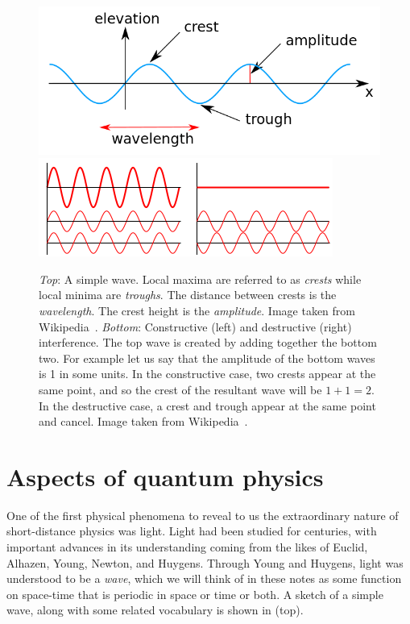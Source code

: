 \begin{figure}
  \centering
  \includegraphics[width=\linewidth]{figs/wave.png}\\
  \includegraphics[width=\linewidth]{figs/interference.png}
  \caption{{\it Top}: A simple wave. Local maxima are referred to as {\it
crests} while local minima are {\it troughs}. The
distance between crests is the {\it wavelength}. The crest
height is the {\it amplitude}. Image taken from
Wikipedia~\cite{wiki:wave}.
{\it Bottom}: Constructive (left) and destructive (right) interference. 
The top wave is created by adding together the bottom two. For example let us
say that the amplitude of the bottom waves is 1 in some units. In the
constructive case, two crests appear at the same point, and so the crest of the
resultant wave will be $1+1=2$. In the destructive case, a crest and trough
appear at the same point and cancel. Image taken from
Wikipedia~\cite{wiki:interfere}.
}
  \label{fig:wave}
\end{figure}

\section{Aspects of quantum physics}\label{sec:QM}

One of the first physical phenomena to reveal to us the extraordinary nature of
short-distance physics was light. Light had been studied for centuries, with
important advances in its understanding coming from the likes of Euclid, Alhazen,
Young, Newton, and Huygens. Through Young and Huygens, light was understood to 
be a {\it wave}, which we will think of in these notes as some function on
space-time that is periodic in space or time or both. A sketch of a simple wave,
along with some related vocabulary is shown in  (top).

